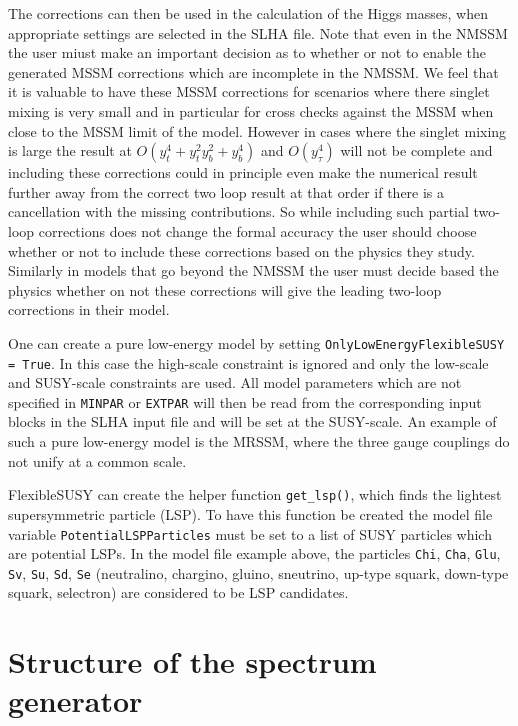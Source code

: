 \documentclass[final,3p,11pt,pdflatex]{elsarticle}
\makeatletter
\newcommand{\fs}{FlexibleSUSY\@\xspace}
\newcommand{\code}[1]{\lstinline|#1|}  %
\makeatother
\begin{document}
 The corrections can then be used in the calculation of the Higgs
 masses, when appropriate settings are selected in the SLHA file. Note
 that even in the NMSSM the user miust make an important decision as
 to whether or not to enable the generated MSSM corrections which are
 incomplete in the NMSSM.  We feel that it is valuable to have
 these MSSM corrections for scenarios where there singlet mixing is
 very small and in particular for cross checks against the MSSM when
 close to the MSSM limit of the model.  However in cases where the
 singlet mixing is large the result at $O(y_t^4 + y_t^2 y_b^2 +
 y_b^4)$ and $O(y_\tau^4)$ will not be complete and including these
 corrections could in principle even make the numerical result further
 away from the correct two loop result at that order if there is a
 cancellation with the missing contributions.  So while including such
 partial two-loop corrections does not change the formal accuracy
 the user should choose whether or not to include these corrections
 based on the physics they study.  Similarly in models that go beyond
 the NMSSM the user must decide based the physics whether on not these
 corrections will give the leading two-loop corrections in their
 model.


One can create a pure low-energy model by setting
\code{OnlyLowEnergyFlexibleSUSY = True}.  In this case the high-scale
constraint is ignored and only the low-scale and SUSY-scale
constraints are used.  All model parameters which are not specified in
\code{MINPAR} or \code{EXTPAR} will then be read from the
corresponding input blocks in the SLHA input file and will be set at
the SUSY-scale.  An example of such a pure low-energy model is the
MRSSM, where the three gauge couplings do not unify at a common scale.

\fs can create the helper function \code{get_lsp()}, which finds the
lightest supersymmetric particle (LSP).  To have this function be
created the model file variable \code{PotentialLSPParticles} must be
set to a list of SUSY particles which are potential LSPs.  In the
model file example above, the particles \code{Chi}, \code{Cha},
\code{Glu}, \code{Sv}, \code{Su}, \code{Sd}, \code{Se} (neutralino,
chargino, gluino, sneutrino, up-type squark, down-type squark,
selectron) are considered to be LSP candidates.

\section{Structure of the spectrum generator}
\label{sec:SpecGenStruct}
\end{document}
